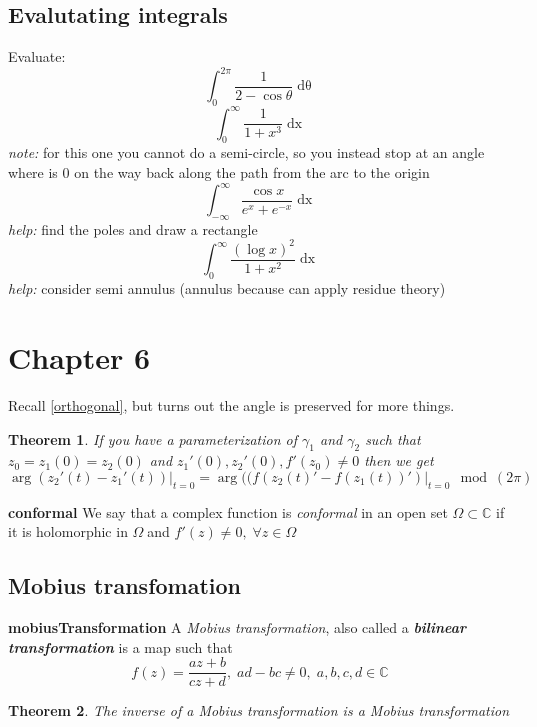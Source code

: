 \documentclass{article}
\newtheorem{theorem}{Theorem}[section]
\newenvironment{definition}[1][Definition]{\begin{trivlist}
\item[\hskip \labelsep {\bfseries #1}]}{\end{trivlist}}
\newcommand{\C}{\mathbb{C}}
\newcommand{\OO}{$ \Omega \;$}
\begin{document}
\subsection*{Evalutating integrals}
Evaluate:
\[ \int_0^{2\pi} \frac{1}{2-\cos \theta}\mathop{d\theta}\]
\[ \int_0^\infty \frac{1}{1+x^3} \mathop{dx} \]
\textit{note: } for this one you cannot do a semi-circle, so you instead stop at an angle where is 0 on the way back along the path from the arc to the origin 
\[ \int_{-\infty}^\infty \frac{\cos x}{e^x+e^{-x}}\mathop{dx} \]
\textit{help: } find the poles and draw a rectangle
\[ \int_0^\infty \frac{(\log x)^2}{1+x^2} \mathop{dx} \]
\textit{help: } consider semi annulus (annulus because can apply residue theory)


\section*{Chapter 6} %
\setcounter{section}{6}

Recall \ref{orthogonal}, but turns out the angle is preserved for more things.
\begin{theorem}
    If you have a parameterization of $\gamma_1$ and $\gamma_2$ such that $z_0 = z_1(0) = z_2(0)$
    and $z_1'(0), z_2'(0), f'(z_0) \neq 0$ then we get
    \[ \arg(z_2'(t) - z_1'(t))\rvert_{t=0} = \arg((f(z_2(t)' -f(z_1(t))')\rvert_{t=0} \mod(2\pi) \]
\end{theorem}

\begin{definition} \label{conformal} \textbf{conformal}
    We say that a complex function is \textit{conformal} in an open set $\Omega \subset \C$ if it is holomorphic in \OO and $f'(z) \neq 0, \; \forall z \in \Omega$
\end{definition}

\subsection*{Mobius transfomation}

\begin{definition} \label{mobiusTransformation} \textbf{mobiusTransformation}
    A \textit{ Mobius transformation}, also called a \textbf{\textit{bilinear transformation}} is a map such that
    \[f(z) = \frac{az+b}{cz+d}, \; ad-bc \neq 0, \; a,b,c,d \in \C \]
\end{definition}

\begin{theorem}
    The inverse of a Mobius transformation is a Mobius transformation
\end{theorem}
\end{document}
